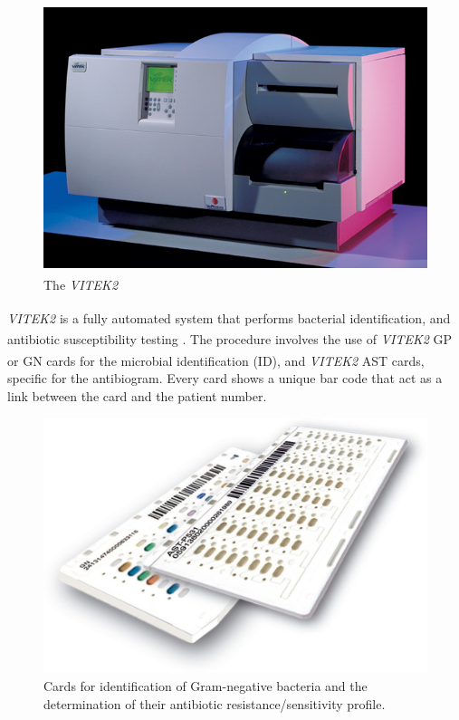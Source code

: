 \documentclass[11pt]{report}
\begin{document}
\begin{figure}[htp]
\centering
\includegraphics[scale=0.500]{img/Vitek_III.jpg}
\caption{The \emph{VITEK}\textsuperscript{\textregistered}\emph{2}}
\label{}
\end{figure}

\emph{VITEK}\textsuperscript{\textregistered}\emph{2} is a fully automated system that performs bacterial identification, and antibiotic susceptibility testing \cite{vitek2}.
The procedure involves the use of \emph{VITEK}\textsuperscript{\textregistered}\emph{2} GP or GN cards for the microbial identification (ID), and \emph{VITEK}\textsuperscript{\textregistered}\emph{2} AST cards, specific for the antibiogram.
Every card shows a unique bar code that act as a link between the card and the patient number.

\begin{figure}[htp]
\centering
\includegraphics[scale=0.20]{img/Vitek_Cards.jpg}
\caption{Cards for identification of Gram-negative bacteria and the determination of their antibiotic resistance/sensitivity profile.}
\label{}
\end{figure}
\end{document}

